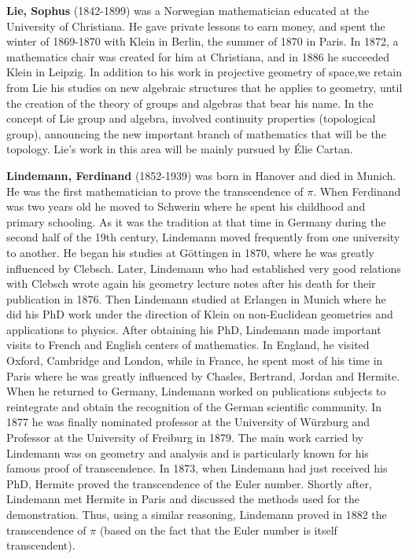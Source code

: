 \textbf{Lie, Sophus} (1842-1899) was a Norwegian mathematician educated at the University of Christiana. He gave private lessons to earn money, and spent the winter of 1869-1870 with Klein in Berlin, the summer of 1870 in Paris. In 1872, a mathematics chair was created for him at Christiana, and in 1886 he succeeded Klein in Leipzig. In addition to his work in projective geometry of space,we retain from Lie his studies on new algebraic structures that he applies to geometry, until the creation of the theory of groups and algebras that bear his name. In the concept of Lie group and algebra, involved continuity properties (topological group), announcing the new important branch of mathematics that will be the topology. Lie's work in this area will be mainly pursued by Élie Cartan.

\textbf{Lindemann, Ferdinand} (1852-1939) was born in Hanover and died in Munich. He was the first mathematician to prove the transcendence of $\pi$. When Ferdinand was two years old he moved to Schwerin where he spent his childhood and primary schooling. As it was the tradition at that time in Germany during the second half of the 19th century, Lindemann moved frequently from one university to another. He began his studies at Göttingen in 1870, where he was greatly influenced by Clebsch. Later, Lindemann who had established very good relations with Clebsch wrote again his geometry lecture notes after his death for their publication in 1876. Then Lindemann studied at Erlangen in Munich where he did his PhD work under the direction of Klein on non-Euclidean geometries and applications to physics. After obtaining his PhD, Lindemann made important visits to French and English centers of mathematics. In England, he visited Oxford, Cambridge and London, while in France, he spent most of his time in Paris where he was greatly influenced by Chasles, Bertrand, Jordan and Hermite. When he returned to Germany, Lindemann worked on publications subjects to reintegrate and obtain the recognition of the German scientific community. In 1877 he was finally nominated professor at the University of Würzburg and Professor at the University of Freiburg in 1879. The main work carried by Lindemann was on geometry and analysis and is particularly known for his famous proof of transcendence. In 1873, when Lindemann had just received his PhD, Hermite proved the transcendence of the Euler number. Shortly after, Lindemann met Hermite in Paris and discussed the methods used for the demonstration. Thus, using a similar reasoning, Lindemann proved in 1882 the transcendence of $\pi$ (based on the fact that the Euler number is itself transcendent).

